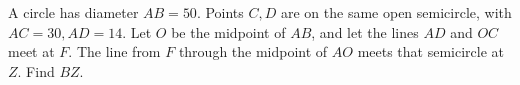 A circle has diameter $AB=50$. Points $C,D$ are on the same open semicircle, with $AC=30,AD=14$. Let $O$ be the midpoint of $AB$, and let the lines $AD$ and $OC$ meet at $F$. The line from $F$ through the midpoint of $AO$ meets that semicircle at $Z$. Find $BZ$.
